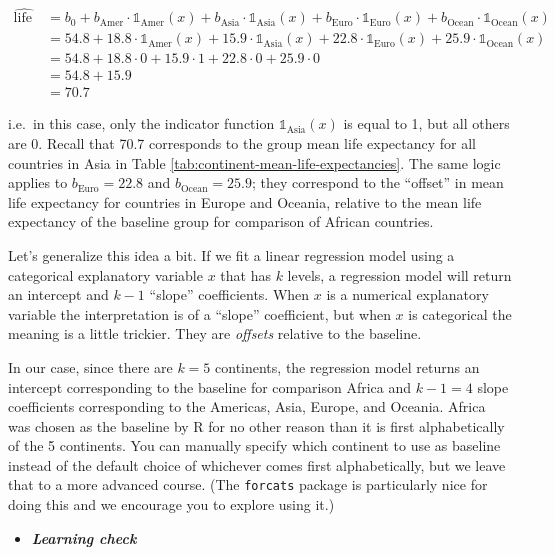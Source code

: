 \documentclass[12pt,]{krantz}
\newenvironment{rmdblock}[1]
  {\begin{shaded*}
  \begin{itemize}
  \renewcommand{\labelitemi}{
    \raisebox{-.7\height}[0pt][0pt]{
    }
  }
  \item
  }
  {
  \end{itemize}
  \end{shaded*}
  }
\newenvironment{learncheck}
  {\begin{rmdblock}{warning}}
  {\end{rmdblock}}
\begin{document}
\begin{align}
\widehat{\text{life exp}} &= b_0 + b_{\text{Amer}}\cdot\mathbb{1}_{\mbox{Amer}}(x) + b_{\text{Asia}}\cdot\mathbb{1}_{\mbox{Asia}}(x)
+ b_{\text{Euro}}\cdot\mathbb{1}_{\mbox{Euro}}(x) + b_{\text{Ocean}}\cdot\mathbb{1}_{\mbox{Ocean}}(x)\\
&= 54.8 + 18.8\cdot\mathbb{1}_{\mbox{Amer}}(x) + 15.9\cdot\mathbb{1}_{\mbox{Asia}}(x)
+ 22.8\cdot\mathbb{1}_{\mbox{Euro}}(x) + 25.9\cdot\mathbb{1}_{\mbox{Ocean}}(x)\\
&= 54.8 + 18.8\cdot 0 + 15.9\cdot 1 + 22.8\cdot 0 + 25.9\cdot 0\\
&= 54.8 + 15.9\\
&= 70.7
\end{align}

i.e.~in this case, only the indicator function
\(\mathbb{1}_{\mbox{Asia}}(x)\) is equal to 1, but all others are 0.
Recall that 70.7 corresponds to the group mean life expectancy for all
countries in Asia in Table \ref{tab:continent-mean-life-expectancies}.
The same logic applies to \(b_{\text{Euro}} = 22.8\) and
\(b_{\text{Ocean}} = 25.9\); they correspond to the ``offset'' in mean
life expectancy for countries in Europe and Oceania, relative to the
mean life expectancy of the baseline group for comparison of African
countries.

Let's generalize this idea a bit. If we fit a linear regression model
using a categorical explanatory variable \(x\) that has \(k\) levels, a
regression model will return an intercept and \(k - 1\) ``slope''
coefficients. When \(x\) is a numerical explanatory variable the
interpretation is of a ``slope'' coefficient, but when \(x\) is
categorical the meaning is a little trickier. They are \emph{offsets}
relative to the baseline.

In our case, since there are \(k = 5\) continents, the regression model
returns an intercept corresponding to the baseline for comparison Africa
and \(k - 1 = 4\) slope coefficients corresponding to the Americas,
Asia, Europe, and Oceania. Africa was chosen as the baseline by R for no
other reason than it is first alphabetically of the 5 continents. You
can manually specify which continent to use as baseline instead of the
default choice of whichever comes first alphabetically, but we leave
that to a more advanced course. (The \texttt{forcats} package is
particularly nice for doing this and we encourage you to explore using
it.)

\begin{learncheck}
\textbf{\emph{Learning check}}
\end{learncheck}
\end{document}
